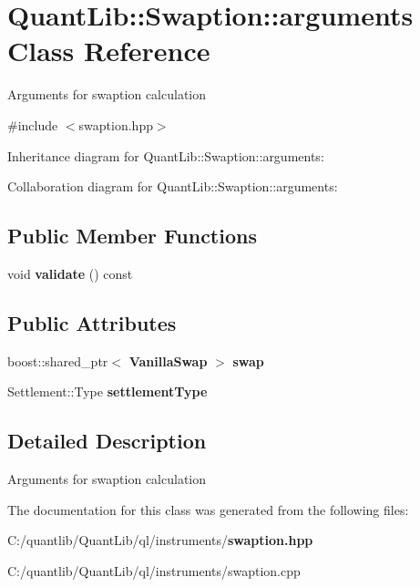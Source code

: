 \section{Quant\+Lib\+:\+:Swaption\+:\+:arguments Class Reference}
\label{class_quant_lib_1_1_swaption_1_1arguments}


Arguments for swaption calculation  




{\ttfamily \#include $<$swaption.\+hpp$>$}



Inheritance diagram for Quant\+Lib\+:\+:Swaption\+:\+:arguments\+:


Collaboration diagram for Quant\+Lib\+:\+:Swaption\+:\+:arguments\+:
\subsection*{Public Member Functions}
\begin{DoxyCompactItemize}
\item 
void {\bfseries validate} () const \label{class_quant_lib_1_1_swaption_1_1arguments_a29dcf1407ed93b97fd875c2d0dac5719}

\end{DoxyCompactItemize}
\subsection*{Public Attributes}
\begin{DoxyCompactItemize}
\item 
boost\+::shared\+\_\+ptr$<$ {\bf Vanilla\+Swap} $>$ {\bfseries swap}\label{class_quant_lib_1_1_swaption_1_1arguments_ab50d123bdaddfdb83e2c1a39d379ea7c}

\item 
Settlement\+::\+Type {\bfseries settlement\+Type}\label{class_quant_lib_1_1_swaption_1_1arguments_a3d71c700febc21f9a650eaa031690edb}

\end{DoxyCompactItemize}


\subsection{Detailed Description}
Arguments for swaption calculation 

The documentation for this class was generated from the following files\+:\begin{DoxyCompactItemize}
\item 
C\+:/quantlib/\+Quant\+Lib/ql/instruments/{\bf swaption.\+hpp}\item 
C\+:/quantlib/\+Quant\+Lib/ql/instruments/swaption.\+cpp\end{DoxyCompactItemize}

